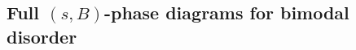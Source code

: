 \documentclass{iopart}
\begin{document}
%
%
%

\subsection{Full $(s,B)$-phase diagrams for bimodal disorder}\label{sec:full_phase_diag_activity}
\end{document}

